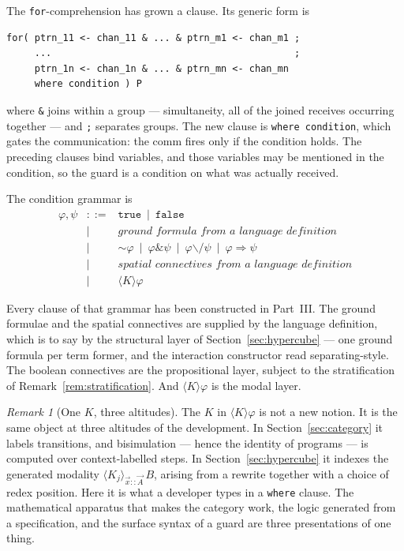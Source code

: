 \documentclass[11pt]{article}
\theoremstyle{definition}
\theoremstyle{plain}
\theoremstyle{remark}
\newtheorem{remark}[definition]{Remark}
\newcommand{\angles}[3]{\langle #1 \rangle_{#2}\,#3}
\begin{document}
The \texttt{for}-comprehension has grown a clause. Its generic form is
\begin{lstlisting}
for( ptrn_11 <- chan_11 & ... & ptrn_m1 <- chan_m1 ;
     ...                                           ;
     ptrn_1n <- chan_1n & ... & ptrn_mn <- chan_mn
     where condition ) P
\end{lstlisting}
where \texttt{\&} joins within a group --- simultaneity, all of the joined receives
occurring together --- and \texttt{;} separates groups. The new clause is
\texttt{where condition}, which gates the communication: the comm fires only if the
condition holds. The preceding clauses bind variables, and those variables may be
mentioned in the condition, so the guard is a condition on what was actually received.

The condition grammar is
\[
\begin{array}{rcl}
\varphi, \psi &::=& \mathtt{true} \ \mid\ \mathtt{false} \\
  &\mid& \textit{ground formula from a language definition} \\
  &\mid& \mathord{\sim}\varphi \ \mid\ \varphi \mathbin{\&} \psi
        \ \mid\ \varphi \mathbin{\backslash/} \psi
        \ \mid\ \varphi \Rightarrow \psi \\
  &\mid& \textit{spatial connectives from a language definition} \\
  &\mid& \langle K \rangle \varphi
\end{array}
\]

Every clause of that grammar has been constructed in Part~III. The ground formulae and the
spatial connectives are supplied by the language definition, which is to say by the
structural layer of Section~\ref{sec:hypercube} --- one ground formula per term former, and
the interaction constructor read separating-style. The boolean connectives are the
propositional layer, subject to the stratification of Remark~\ref{rem:stratification}. And
$\langle K \rangle \varphi$ is the modal layer.

\begin{remark}[One $K$, three altitudes]
\label{rem:oneK}
The $K$ in $\langle K \rangle \varphi$ is not a new notion. It is the same object at three
altitudes of the development. In Section~\ref{sec:category} it labels transitions, and
bisimulation --- hence the identity of programs --- is computed over context-labelled
steps. In Section~\ref{sec:hypercube} it indexes the generated modality
$\angles{K_j}{\vec x :: \vec A}{B}$, arising from a rewrite together with a choice of redex
position. Here it is what a developer types in a \texttt{where} clause. The mathematical
apparatus that makes the category work, the logic generated from a specification, and the
surface syntax of a guard are three presentations of one thing.
\end{remark}
\end{document}
